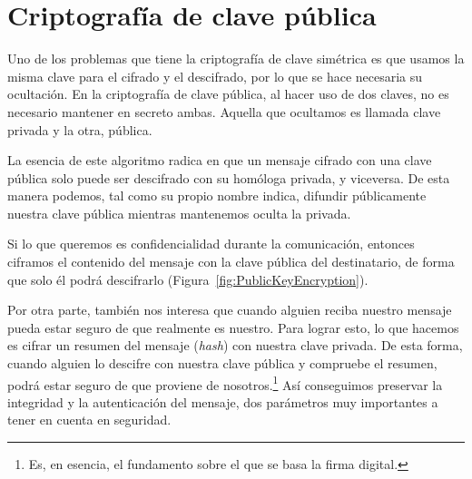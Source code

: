 \section{Criptografía de clave pública}

Uno de los problemas que tiene la criptografía de clave simétrica es que usamos la misma clave para el cifrado y el descifrado, por lo que se hace necesaria su ocultación. En la criptografía de clave pública, al hacer uso de dos claves, no es necesario mantener en secreto ambas. Aquella que ocultamos es llamada clave privada y la otra, pública.

La esencia de este algoritmo radica en que un mensaje cifrado con una clave pública solo puede ser descifrado con su homóloga privada, y viceversa. De esta manera podemos, tal como su propio nombre indica, difundir públicamente nuestra clave pública mientras mantenemos oculta la privada.

Si lo que queremos es confidencialidad durante la comunicación, entonces ciframos el contenido del mensaje con la clave pública del destinatario, de forma que solo él podrá descifrarlo (Figura~\ref{fig:PublicKeyEncryption}).

Por otra parte, también nos interesa que cuando alguien reciba nuestro mensaje pueda estar seguro de que realmente es nuestro. Para lograr esto, lo que hacemos es cifrar un resumen del mensaje (\emph{hash}) con nuestra clave privada. De esta forma, cuando alguien lo descifre con nuestra clave pública y compruebe el resumen, podrá estar seguro de que proviene de nosotros.\footnote{Es, en esencia, el fundamento sobre el que se basa la firma digital.} Así conseguimos preservar la integridad y la autenticación del mensaje, dos parámetros muy importantes a tener en cuenta en seguridad. \emph{\parencite{Reference14}}


